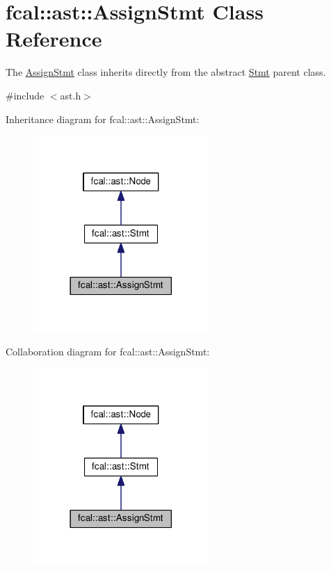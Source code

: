 \hypertarget{classfcal_1_1ast_1_1AssignStmt}{}\section{fcal\+:\+:ast\+:\+:Assign\+Stmt Class Reference}
\label{classfcal_1_1ast_1_1AssignStmt}


The \hyperlink{classfcal_1_1ast_1_1AssignStmt}{Assign\+Stmt} class inherits directly from the abstract \hyperlink{classfcal_1_1ast_1_1Stmt}{Stmt} parent class.  




{\ttfamily \#include $<$ast.\+h$>$}



Inheritance diagram for fcal\+:\+:ast\+:\+:Assign\+Stmt\+:
\nopagebreak
\begin{figure}[H]
\begin{center}
\leavevmode
\includegraphics[width=189pt]{classfcal_1_1ast_1_1AssignStmt__inherit__graph}
\end{center}
\end{figure}


Collaboration diagram for fcal\+:\+:ast\+:\+:Assign\+Stmt\+:
\nopagebreak
\begin{figure}[H]
\begin{center}
\leavevmode
\includegraphics[width=189pt]{classfcal_1_1ast_1_1AssignStmt__coll__graph}
\end{center}
\end{figure}
